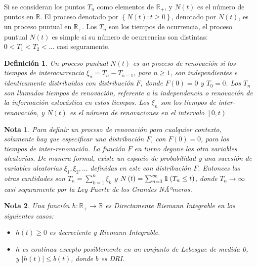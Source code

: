 \documentclass{article}
\newtheorem{Def}{Definición}[section]
\newtheorem{Note}{Nota}[section]
\newcommand{\rea}{\mathbb{R}}
\newcommand{\indora}{\mbox{$1$\hspace{-0.8ex}$1$}}
\numberwithin{equation}{section}
\begin{document}
Si se consideran los puntos $T_{n}$ como elementos de $\rea_{+}$, y $N\left(t\right)$ es el n\'umero de puntos en $\rea$. El proceso denotado por $\left\{N\left(t\right):t\geq0\right\}$, denotado por $N\left(t\right)$, es un proceso puntual en $\rea_{+}$. Los $T_{n}$ son los tiempos de ocurrencia, el proceso puntual $N\left(t\right)$ es simple si su n\'umero de ocurrencias son distintas: $0<T_{1}<T_{2}<\ldots$ casi seguramente.

\begin{Def}
Un proceso puntual $N\left(t\right)$ es un proceso de renovaci\'on si los tiempos de interocurrencia $\xi_{n}=T_{n}-T_{n-1}$, para $n\geq1$, son independientes e identicamente distribuidos con distribuci\'on $F$, donde $F\left(0\right)=0$ y $T_{0}=0$. Los $T_{n}$ son llamados tiempos de renovaci\'on, referente a la independencia o renovaci\'on de la informaci\'on estoc\'astica en estos tiempos. Los $\xi_{n}$ son los tiempos de inter-renovaci\'on, y $N\left(t\right)$ es el n\'umero de renovaciones en el intervalo $\left[0,t\right)$
\end{Def}


\begin{Note}
Para definir un proceso de renovaci\'on para cualquier contexto, solamente hay que especificar una distribuci\'on $F$, con $F\left(0\right)=0$, para los tiempos de inter-renovaci\'on. La funci\'on $F$ en turno degune las otra variables aleatorias. De manera formal, existe un espacio de probabilidad y una sucesi\'on de variables aleatorias $\xi_{1},\xi_{2},\ldots$ definidas en este con distribuci\'on $F$. Entonces las otras cantidades son $T_{n}=\sum_{k=1}^{n}\xi_{k}$ y $N\left(t\right)=\sum_{n=1}^{\infty}\indora\left(T_{n}\leq t\right)$, donde $T_{n}\rightarrow\infty$ casi seguramente por la Ley Fuerte de los Grandes NÃºmeros.
\end{Note}

%
%

\begin{Note} Una funci\'on $h:\rea_{+}\rightarrow\rea$ es Directamente Riemann Integrable en los siguientes casos:
\begin{itemize}
\item[a)] $h\left(t\right)\geq0$ es decreciente y Riemann Integrable.
\item[b)] $h$ es continua excepto posiblemente en un conjunto de Lebesgue de medida 0, y $|h\left(t\right)|\leq b\left(t\right)$, donde $b$ es DRI.
\end{itemize}
\end{Note}
\end{document}
